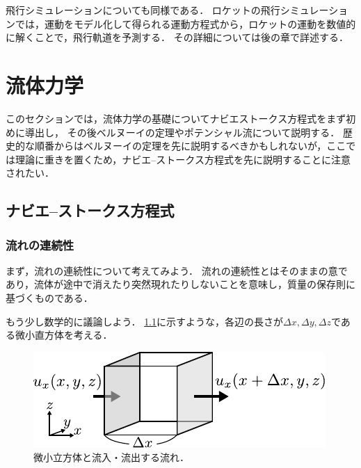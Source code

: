 \documentclass[uplatex,dvipdfmx,a4j,11pt]{jsreport}
\numberwithin{equation}{chapter}
\begin{document}
\enskip

飛行シミュレーションについても同様である．
ロケットの飛行シミュレーションでは，運動をモデル化して得られる運動方程式から，ロケットの運動を数値的に解くことで，飛行軌道を予測する．
その詳細については後の章で詳述する．


\chapter{流体力学}

このセクションでは，流体力学の基礎についてナビエストークス方程式をまず初めに導出し，
その後ベルヌーイの定理やポテンシャル流について説明する．
歴史的な順番からはベルヌーイの定理を先に説明するべきかもしれないが，ここでは理論に重きを置くため，ナビエ--ストークス方程式を先に説明することに注意されたい．

\enskip

\section{ナビエ--ストークス方程式}
\subsection{流れの連続性}
まず，流れの連続性について考えてみよう．
流れの連続性とはそのままの意であり，流体が途中で消えたり突然現れたりしないことを意味し，質量の保存則に基づくものである．

\enskip

もう少し数学的に議論しよう．
\cref{fig:continuity_equation}に示すような，各辺の長さが$\Delta x, \Delta y, \Delta z$である微小直方体を考える．
\begin{figure}[H]
  \centering
  \includegraphics{aero/img/continuity_equation.pdf}
  \caption{微小立方体と流入・流出する流れ．}
  \label{fig:continuity_equation}
\end{figure}
\end{document}
